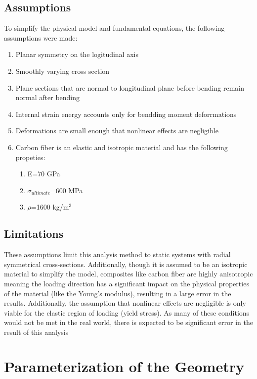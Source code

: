 \documentclass[11pt]{article}%
\begin{document}
\subsection{Assumptions}
\label{sec:assumption}
To simplify the physical model and fundamental equations, the following assumptions were made:
\begin{enumerate}
   	 \item Planar symmetry on the logitudinal axis
    	\item Smoothly varying cross section
	\item Plane sections that are normal to longitudinal plane before bending remain normal after bending 
	\item Internal strain energy accounts only for bendding moment deforrmations
	\item Deformations are small enough that nonlinear effects are negligible
	\item Carbon fiber is an elastic and isotropic material and has the following propeties:
	\begin{enumerate}
	\item E=70 GPa
	\item $\sigma_{ultimate}$=600 MPa
	\item $\rho$=1600 kg/m$^{3}$
	\end{enumerate}
\end{enumerate}

\subsection{Limitations}

These assumptions limit this analysis method to static systems with radial symmetrical cross-sections. Additionally, though it is assumed to be an isotropic material to simplify the model, composites like carbon fiber are highly anisotropic meaning the loading direction has a significant impact on the physical properties of the material (like the Young’s modulus), resulting in a large error in the results. Additionally, the assumption that nonlinear effects are negligible is only viable for the elastic region of loading (yield stress). As many of these conditions would not be met in the real world, there is expected to be significant error in the result of this analysis

\section{Parameterization of the Geometry}
\label{sec:parameterization}
\end{document}
